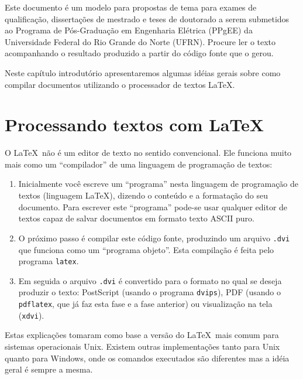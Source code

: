 
\label{Cap:introducao}

Este documento é um modelo para propostas de tema para exames de
qualificação, dissertações de mestrado e teses de doutorado a serem
submetidos ao Programa de Pós-Graduação em Engenharia Elétrica (PPgEE)
da Universidade Federal do Rio Grande do Norte (UFRN).  Procure ler o
texto acompanhando o resultado produzido a partir do código fonte que
o gerou.

Neste capítulo introdutório apresentaremos algumas idéias gerais sobre
como compilar documentos utilizando o processador de textos \LaTeX.

\section{Processando textos com \LaTeX}

O \LaTeX\ não é um editor de texto no sentido convencional. Ele funciona
muito mais como um ``compilador'' de uma linguagem de programação de
textos:%
%
\begin{enumerate}
\item Inicialmente você escreve um ``programa'' nesta linguagem de
programação de textos (linguagem \LaTeX), dizendo o conteúdo e a
formatação do seu documento.  Para escrever este ``programa'' pode-se
usar qualquer editor de textos capaz de salvar documentos em formato
texto ASCII puro.
\item O próximo passo é compilar este código fonte, produzindo um arquivo
\texttt{.dvi} que funciona como um ``programa objeto''. Esta compilação
é feita pelo programa \texttt{latex}.
\item Em seguida o arquivo \texttt{.dvi} é convertido para o formato no
qual se deseja produzir o texto: PostScript (usando o programa
\texttt{dvips}), PDF (usando o \texttt{pdflatex}, que já faz esta fase
e a fase anterior) ou visualização na tela (\texttt{xdvi}).
\end{enumerate}
Estas explicações tomaram como base a versão do \LaTeX\ mais comum para
sistemas operacionais Unix. Existem outras implementações tanto para
Unix quanto para Windows, onde os comandos executados são diferentes
mas a idéia geral é sempre a mesma.

